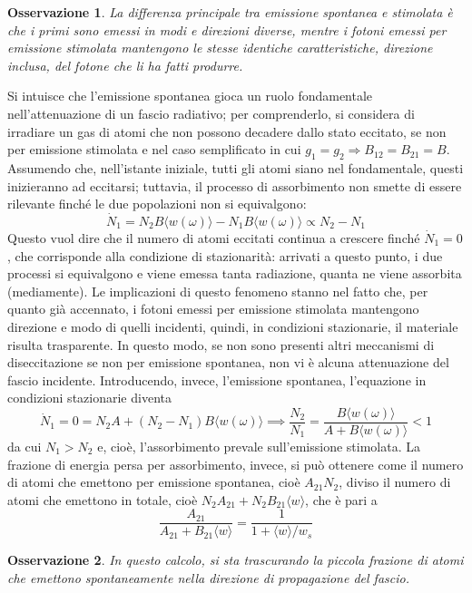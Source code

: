\documentclass[11pt, a4paper]{scrartcl}
\theoremstyle{style}
\newtheorem{osservazione}{Osservazione}[section]
\numberwithin{equation}{subsection}
\begin{document}
\begin{osservazione}
La differenza principale tra emissione spontanea e stimolata \`e che i primi sono emessi in modi e direzioni diverse, mentre i fotoni emessi per emissione stimolata mantengono le stesse identiche caratteristiche, direzione inclusa, del fotone che li ha fatti produrre.
\end{osservazione}

\noindent Si intuisce che l'emissione spontanea gioca un ruolo fondamentale nell'attenuazione di un fascio radiativo; per comprenderlo, si considera di irradiare un gas di atomi che non possono decadere dallo stato eccitato, se non per emissione stimolata e nel caso semplificato in cui $g_1=g_2\Rightarrow B_{12}=B_{21}=B$.
Assumendo che, nell'istante iniziale, tutti gli atomi siano nel fondamentale, questi inizieranno ad eccitarsi; tuttavia, il processo di assorbimento non smette di essere rilevante finch\'e le due popolazioni non si equivalgono:
\[
\dot{N}_1 = N_2 B \langle w(\omega ) \rangle - N_1 B \langle w(\omega ) \rangle \propto N_2 - N_1
\] 
Questo vuol dire che il numero di atomi eccitati continua a crescere finch\'e $\dot{N}_1 = 0$, che corrisponde alla condizione di stazionarit\`a: arrivati a questo punto, i due processi si equivalgono e viene emessa tanta radiazione, quanta ne viene assorbita (mediamente).
Le implicazioni di questo fenomeno stanno nel fatto che, per quanto gi\`a accennato, i fotoni emessi per emissione stimolata mantengono direzione e modo di quelli incidenti, quindi, in condizioni stazionarie, il materiale risulta trasparente.
In questo modo, se non sono presenti altri meccanismi di diseccitazione se non per emissione spontanea, non vi \`e alcuna attenuazione del fascio incidente.
Introducendo, invece, l'emissione spontanea, l'equazione in condizioni stazionarie diventa 
\[
\dot{N}_1 = 0 = N_2 A + (N_2 -N_1)B\langle w(\omega ) \rangle \implies \frac{N_2}{N_1} = \frac{B\langle w(\omega ) \rangle}{A + B \langle w(\omega ) \rangle} < 1
\] 
da cui $N_1 > N_2$ e, cio\`e, l'assorbimento prevale sull'emissione stimolata.
La frazione di energia persa per assorbimento, invece, si pu\`o ottenere come il numero di atomi che emettono per emissione spontanea, cio\`e $A_{21} N_2$, diviso il numero di atomi che emettono in totale, cio\`e $N_2 A_{21} + N_2 B_{21} \langle w \rangle$, che \`e pari a 
\[
\frac{A_{21}}{A_{21}+B_{21} \langle w \rangle} = \frac{1}{1 + \langle w \rangle / w_s}
\] 
\begin{osservazione}
In questo calcolo, si sta trascurando la piccola frazione di atomi che emettono spontaneamente nella direzione di propagazione del fascio.
\end{osservazione}
\end{document}
